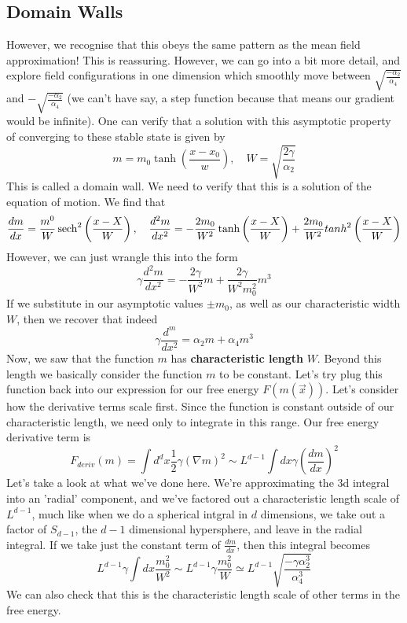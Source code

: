 \documentclass[11pt, oneside]{article}   	%
\begin{document}
\subsection{Domain Walls}
However, we recognise that this obeys the same pattern as the mean field approximation! This is reassuring. However, we can go into a bit more detail, and explore field configurations in one dimension which smoothly move between $ \sqrt{ \frac{  - \alpha_2 }{ \alpha_4 } }$ and $  - \sqrt{ \frac{  - \alpha_2 }{ \alpha_4 } } $ (we can't have say, a step function because that means our gradient would be infinite). One can verify that a solution with this asymptotic property of converging to these stable state is given by 
\[ 
m = m_0 \tanh \left( \frac{ x - x_0}{ w }  \right), \quad W = \sqrt{ \frac{ 2 \gamma }{ \alpha_2 } } 
\] This is called a domain wall. 
We need to verify that this is a solution of the equation of motion.
We find that 
\[	\frac{d m }{dx } = \frac{m^{0 }}{W} \sech^2 \left( \frac{x - X}{W} \right), \quad \frac{d^2 m }{dx^ 2 } =  - \frac{2m_0 }{W^ 2 } \tanh \left( \frac{x - X}{W} \right) 	+ \frac{2 m_0 }{W^ 2} tanh^2 \left( \frac{x - X }{W} \right)   	\] 
However, we can just wrangle this into the form 
\[
\gamma \frac{d^ 2 m }{dx^ 2 } = - \frac{2 \gamma }{W^ 2 }m  +  \frac{ 2 \gamma }{W^ 2 m_{0 }^2 }m ^ 3 
\] If we substitute in our asymptotic values $ \pm m_{0 }$, as well as our characteristic width $W$, then 
we recover that indeed 
\[
\gamma \frac{d^ m }{dx^ 2 } = \alpha_2 m + \alpha_4 m^{3}
\] 
Now, we saw that the function $m $ has \textbf{ characteristic length} $ W$. Beyond this length 
we basically consider the function $ m $ to be constant. Let's try 
plug this function back into our expression for our free energy $ F ( m ( \vec{x}) ) $. 
Let's consider how the derivative terms scale first. Since the function is constant outside of our characteristic length, 
we need only to integrate in this range. Our free energy derivative term is 
\[
F_{deriv } ( m ) = \int d^{d} x \frac{1}{2 } \gamma ( \nabla m )^ 2 \sim L^{d -1 } \int dx \gamma \left( \frac{ d m  }{dx} \right)^2  
\] Let's take a look at what we've done here. We're approximating the 3d integral 
into an 'radial' component, 
and we've factored out a characteristic length scale of $L^{d - 1}$, much like 
when we do a spherical intgral in $ d$ dimensions, we take out a factor of 
$ S_{d -1 } $, the $ d - 1$ dimensional hypersphere, and leave in the 
radial integral. 
If we take just the constant term of $\frac{d m  }{ dx }$, then this integral 
becomes 
\[
 L^{d - 1} \gamma \int dx \frac{m_0^2 }{W^ 2}  \sim  L^{d - 1} \gamma \frac{m_{0}^2 }{W} \simeq L^{d -1 }\sqrt{\frac{ - \gamma \alpha_2^3 }{\alpha_4^3 }}  
\] We can also check that 
this is the characteristic length scale of other terms in the free energy. 
\end{document}
